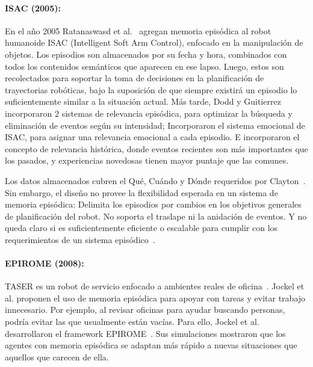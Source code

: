 \paragraph{ISAC (2005):}
En el año 2005 Ratanaswasd et al.~\cite{Ratanaswasd2005} agregan memoria episódica al robot humanoide ISAC (Intelligent Soft Arm Control), enfocado en la manipulación de objetos. Los episodios son almacenados por su fecha y hora, combinados con todos los contenidos semánticos que aparecen en ese lapso. Luego, estos son recolectados para soportar la toma de decisiones en la planificación de trayectorias robóticas, bajo la suposición de que siempre existirá un episodio lo suficientemente similar a la situación actual. Más tarde, Dodd y Guitierrez~\cite{Dodd2005} incorporaron 2 sistemas de relevancia episódica, para optimizar la búsqueda y eliminación de eventos según su intensidad; Incorporaron el sistema emocional de ISAC, para asignar una relevancia emocional a cada episodio. E incorporaron el concepto de relevancia histórica, donde eventos recientes son más importantes que los pasados, y experiencias novedosas tienen mayor puntaje que las comunes.

Los datos almacenados cubren el Qué, Cuándo y Dónde requeridos por Clayton~\cite{CLAYTON20092330}. Sin embargo, el diseño no provee la flexibilidad esperada en un sistema de memoria episódica:  Delimita los episodios por cambios en los objetivos generales de planificación del robot. No soporta el traslape ni la anidación de eventos. Y no queda claro si es suficientemente eficiente o escalable para cumplir con los requerimientos de un sistema episódico~\cite{Stachowicz2012}.

\paragraph{EPIROME (2008):} 

TASER es un robot de servicio enfocado a ambientes reales de oficina~\cite{Jockel2007}. Jockel et al. proponen el uso de memoria episódica para apoyar con tareas y evitar trabajo innecesario. Por ejemplo, al revisar oficinas para ayudar buscando personas, podría evitar las que usualmente están vacías. Para ello, Jockel et al. desarrollaron el framework EPIROME~\cite{Jockel2007,Jockel2008}. Sus simulaciones mostraron que los agentes con memoria episódica se adaptan más rápido a nuevas situaciones que aquellos que carecen de ella.


